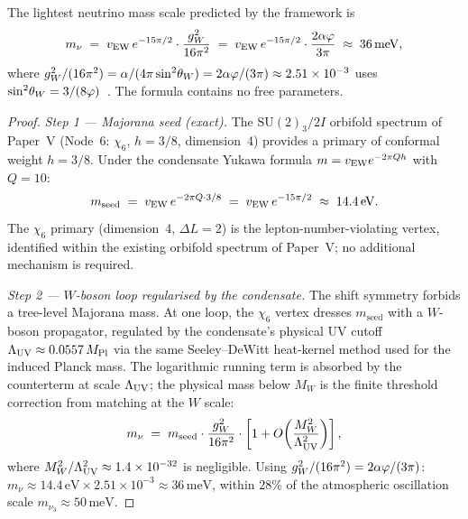 \begin{proposition}
\label{P7:prop:neutrino}
The lightest neutrino mass scale predicted by the framework is
\begin{equation}
  m_\nu
  \;=\; v_{\mathrm{EW}}\,e^{-15\pi/2}\cdot\frac{g_W^2}{16\pi^2}
  \;=\; v_{\mathrm{EW}}\,e^{-15\pi/2}\cdot\frac{2\alpha\varphi}{3\pi}
  \;\approx\; 36\,\mathrm{meV},
  \label{P7:eq:mnu_prop}
\end{equation}
where $g_W^2/(16\pi^2) = \alpha/(4\pi\sin^{2}\!\theta_{W}) = 2\alpha\varphi/(3\pi)
\approx2.51\times10^{-3}$ uses $\sin^{2}\!\theta_{W} = 3/(8\varphi)$~\cite{Paper1}.
The formula contains no free parameters.
\end{proposition}
\begin{proof}
\emph{Step 1 --- Majorana seed (exact).} The $\mathrm{SU}(2)_3/2I$
orbifold spectrum of Paper~V (Node~6: $\chi_6$, $h=3/8$, dimension~4)
provides a primary of conformal weight $h=3/8$. Under the condensate
Yukawa formula $m=v_{\mathrm{EW}} e^{-2\pi Qh}$ with $Q=10$:
\begin{equation}
  m_{\mathrm{seed}}
  \;=\; v_{\mathrm{EW}}\,e^{-2\pi Q\cdot 3/8}
  \;=\; v_{\mathrm{EW}}\,e^{-15\pi/2}
  \;\approx\; 14.4\,\mathrm{eV}.
  \label{P7:eq:mnu_seed}
\end{equation}
The $\chi_6$ primary (dimension~4, $\Delta L=2$) is the
lepton-number-violating vertex, identified within the existing
orbifold spectrum of Paper~V; no additional mechanism is required.

\emph{Step 2 --- $W$-boson loop regularised by the condensate.} The
shift symmetry forbids a tree-level Majorana mass. At one loop, the
$\chi_6$ vertex dresses $m_{\mathrm{seed}}$ with a $W$-boson
propagator, regulated by the condensate's physical UV cutoff
$\Lambda_{\mathrm{UV}}\approx0.0557\,M_{\mathrm{Pl}}$ via the same Seeley--DeWitt heat-kernel
method used for the induced Planck mass. The logarithmic running term
is absorbed by the counterterm at scale $\Lambda_{\mathrm{UV}}$; the physical mass
below $M_W$ is the finite threshold correction from matching at the
$W$ scale:
\begin{equation}
  m_\nu
  \;=\; m_{\mathrm{seed}}\cdot\frac{g_W^2}{16\pi^2}
        \cdot\left[1 + O\!\left(\frac{M_W^2}{\Lambda_{\mathrm{UV}}^2}\right)\right],
  \label{P7:eq:mnu_matching}
\end{equation}
where $M_W^2/\Lambda_{\mathrm{UV}}^2\approx1.4\times10^{-32}$ is negligible. Using
$g_W^2/(16\pi^2)=2\alpha\varphi/(3\pi)$: $m_\nu\approx14.4\,\mathrm{eV}
\times2.51\times10^{-3}\approx36\,\mathrm{meV}$, within $28\%$ of the
atmospheric oscillation scale $m_{\nu_3}\approx50\,\mathrm{meV}$.
\end{proof}

